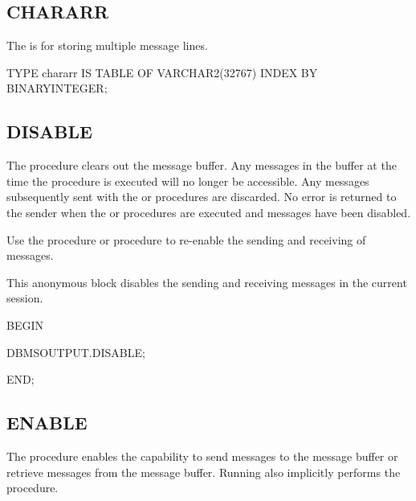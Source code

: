 \documentclass[letterpaper,10pt,english,openany,oneside]{sphinxmanual}
\begin{document}
\subsection{CHARARR}
\label{\detokenize{dbms_output:chararr}}
The  is for storing multiple message lines.

%
\begin{sphinxVerbatim}[commandchars=\\\{\}]
TYPE chararr IS TABLE OF VARCHAR2(32767) INDEX BY BINARY\PYGZus{}INTEGER;
\end{sphinxVerbatim}

\newpage

\ignorespaces 

\subsection{DISABLE}
\label{\detokenize{dbms_output:disable}}\label{\detokenize{dbms_output:index-2}}
The  procedure clears out the message buffer. Any messages in the
buffer at the time the  procedure is executed will no longer be
accessible. Any messages subsequently sent with the  or
 procedures are discarded. No error is returned to the sender
when the  or  procedures are executed and
messages have been disabled.

Use the  procedure or  procedure to re-enable
the sending and receiving of messages.



This anonymous block disables the sending and receiving messages in the
current session.

%
\begin{sphinxVerbatim}[commandchars=\\\{\}]
BEGIN

  DBMS\PYGZus{}OUTPUT.DISABLE;

END;
\end{sphinxVerbatim}

\newpage

\ignorespaces 

\subsection{ENABLE}
\label{\detokenize{dbms_output:index-3}}\label{\detokenize{dbms_output:enable}}
The  procedure enables the capability to send messages to the
message buffer or retrieve messages from the message buffer. Running
 also implicitly performs the  procedure.
\end{document}
